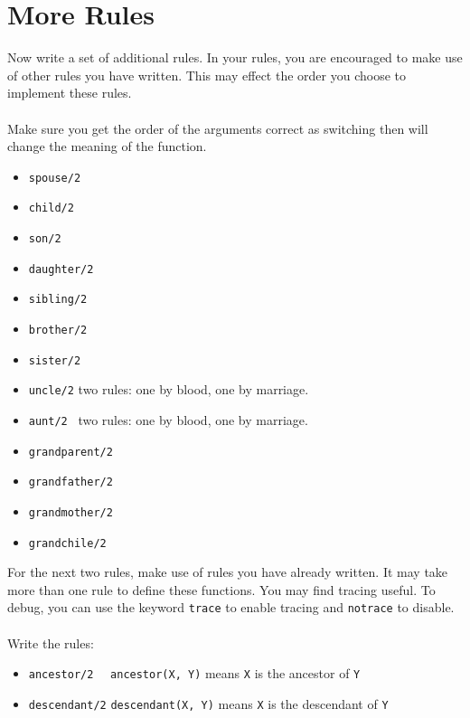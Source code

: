\documentclass{article}
\begin{document}
\section*{More Rules}
Now write a set of additional rules. In your rules, you are encouraged to make use of other rules you have written. This may effect the order you choose to implement these rules.
\\\\
\noindent Make sure you get the order of the arguments correct as switching then will change the meaning of the function.
\begin{itemize}
 \item \verb|spouse/2|
 \item \verb|child/2|
 \item \verb|son/2|
 \item \verb|daughter/2|
 \item \verb|sibling/2|
 \item \verb|brother/2|
 \item \verb|sister/2|
 \item \verb|uncle/2| \hspace{2em} two rules: one by blood, one by marriage.
 \item \verb|aunt/2|\,\,\, \hspace{2em} two rules: one by blood, one by marriage.
 \item \verb|grandparent/2|
 \item \verb|grandfather/2|
 \item \verb|grandmother/2|
 \item \verb|grandchile/2|
\end{itemize}

\noindent For the next two rules, make use of rules you have already written. It may take more than one rule to define these functions. You may find tracing useful. To debug, you can use the keyword \verb|trace| to enable tracing and \verb|notrace| to disable.
\\\\
\noindent Write the rules:
\begin{itemize}
 \item \verb|ancestor/2|\,\,\,\,\,\, \hspace{2em} \verb|ancestor(X, Y)| means \verb|X| is the ancestor of \verb|Y|
 \item \verb|descendant/2| \hspace{2em} \verb|descendant(X, Y)| means \verb|X| is the descendant of \verb|Y|
\end{itemize}
\end{document}
